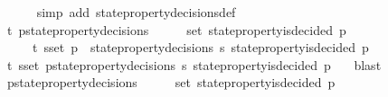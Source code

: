 \begin{isabellebody}
\ \ \ \ \isamarkupfalse%
\ {\isacharparenleft}simp\ add{\isacharcolon}\ state{\isacharunderscore}property{\isacharunderscore}decisions{\isacharunderscore}def{\isacharparenright}\isanewline
\ \ \isamarkupfalse%
\ {\isachardoublequoteopen}{\isasymexists}{\isasymsigma}{\isasymin}{\isasymSigma}t{\isachardot}\ {\isasymforall}p{\isasymin}{\isasymUnion}{\isacharbraceleft}state{\isacharunderscore}property{\isacharunderscore}decisions\ {\isasymsigma}\ {\isacharbar}\ {\isasymsigma}{\isachardot}\ {\isasymsigma}\ {\isasymin}\ {\isasymsigma}{\isacharunderscore}set{\isacharbraceright}{\isachardot}\ state{\isacharunderscore}property{\isacharunderscore}is{\isacharunderscore}decided\ {\isacharparenleft}p{\isacharcomma}{\isasymsigma}{\isacharparenright}{\isachardoublequoteclose}\isanewline
\ \ \isamarkupfalse%
{\isacharminus}\isanewline
\ \ \ \ \isamarkupfalse%
\ {\isasymsigma}\ \ {\isachardoublequoteopen}{\isasymsigma}\ {\isasymin}\ {\isasymSigma}t{\isachardoublequoteclose}\ {\isachardoublequoteopen}{\isasymforall}s{\isasymin}{\isasymsigma}{\isacharunderscore}set{\isachardot}\ {\isacharparenleft}{\isasymforall}p\ {\isasymin}\ state{\isacharunderscore}property{\isacharunderscore}decisions\ s{\isachardot}\ state{\isacharunderscore}property{\isacharunderscore}is{\isacharunderscore}decided\ {\isacharparenleft}p{\isacharcomma}{\isasymsigma}{\isacharparenright}{\isacharparenright}{\isachardoublequoteclose}\isanewline
\ \ \ \ \ \ \isamarkupfalse%
\ {\isacartoucheopen}{\isasymexists}{\isasymsigma}{\isasymin}{\isasymSigma}t{\isachardot}\ {\isasymforall}s{\isasymin}{\isasymsigma}{\isacharunderscore}set{\isachardot}\ {\isasymforall}p{\isasymin}state{\isacharunderscore}property{\isacharunderscore}decisions\ s{\isachardot}\ state{\isacharunderscore}property{\isacharunderscore}is{\isacharunderscore}decided\ {\isacharparenleft}p{\isacharcomma}\ {\isasymsigma}{\isacharparenright}{\isacartoucheclose}\ \isamarkupfalse%
\ blast\isanewline
\ \ \ \ \isamarkupfalse%
\ {\isachardoublequoteopen}{\isasymforall}p{\isasymin}{\isasymUnion}{\isacharbraceleft}state{\isacharunderscore}property{\isacharunderscore}decisions\ {\isasymsigma}\ {\isacharbar}\ {\isasymsigma}{\isachardot}\ {\isasymsigma}\ {\isasymin}\ {\isasymsigma}{\isacharunderscore}set{\isacharbraceright}{\isachardot}\ state{\isacharunderscore}property{\isacharunderscore}is{\isacharunderscore}decided\ {\isacharparenleft}p{\isacharcomma}{\isasymsigma}{\isacharparenright}{\isachardoublequoteclose}\isanewline

\end{isabellebody}
